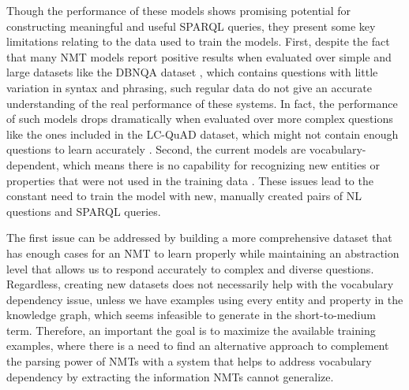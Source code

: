 Though the performance of these models shows promising potential for constructing meaningful 
and useful SPARQL queries, they present some key limitations relating to the data 
used to train the models. First, despite the fact that many NMT models report positive results 
when evaluated over simple and large datasets like the DBNQA dataset \cite{nmt:nl-to-sparql-Yin19}, which 
contains questions with little variation in syntax and phrasing, such regular data do not give an accurate 
understanding of the real performance of these systems. In fact, the performance of such models drops 
dramatically when evaluated over more complex questions like the ones included in the LC-QuAD 
dataset, which might not contain enough questions to learn accurately \cite{nmt:nl-to-sparql-Yin19}. Second, 
the current models are vocabulary-dependent, which means there is no capability for recognizing 
new entities or properties that were not used in the training data \cite{nmt:nl-to-sparql-Yin19}. These issues lead 
to the constant need to train the model with new, manually created pairs of NL questions 
and SPARQL queries.

The first issue can be addressed by building a more comprehensive dataset that has enough 
cases for an NMT to learn properly while maintaining an abstraction level that allows us to 
respond accurately to complex and diverse questions. Regardless, creating new datasets does 
not necessarily help with the vocabulary dependency issue, unless we have examples using 
every entity and property in the knowledge graph, which seems infeasible to generate in the 
short-to-medium term. Therefore, an important the goal is to maximize the available training examples, 
where there is a need to find an alternative approach to complement the parsing power 
of NMTs with a system that helps to address vocabulary dependency by extracting the 
information NMTs cannot generalize.

